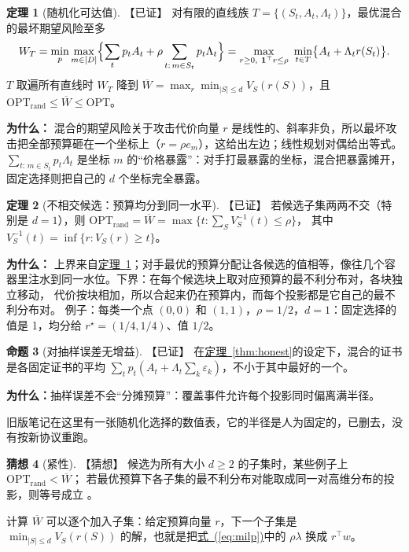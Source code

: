 \documentclass[11pt,a4paper,fontset=none]{ctexart}
\newcommand{\Eqref}[1]{\hyperref[#1]{式~(\ref*{#1})}}
\newcommand{\Nref}[2]{\hyperref[#2]{#1~\ref*{#2}}}
\theoremstyle{definition}
\newtheorem{proposition}{命题}
\newtheorem{theorem}[proposition]{定理}
\newtheorem{conjecture}[proposition]{猜想}
\newenvironment{why}{\par\noindent\textbf{为什么：}\ignorespaces}{\par}
\newcommand{\status}[1]{\textrm{【#1】}}
\begin{document}
\begin{theorem}[随机化可达值]\label{thm:random}\status{已证}
对有限的直线族 $T=\{(S_t,A_t,\Lambda_t)\}$，最优混合的最坏期望风险至多
\begin{equation}\label{eq:wt}
W_T=\min_p\max_{m\in[D]}\Bigl\{\sum_tp_tA_t+\rho\sum_{t:\,m\in S_t}p_t\Lambda_t\Bigr\}
=\max_{r\ge0,\ \mathbf 1^\top r\le\rho}\ \min_{t\in T}\bigl\{A_t+\Lambda_tr(S_t)\bigr\}.
\end{equation}
$T$ 取遍所有直线时 $W_T$ 降到 $\overline W=\max_r\min_{|S|\le d}V_S(r(S))$，且 $\mathrm{OPT}_{\mathrm{rand}}\le\overline W\le\mathrm{OPT}$。
\end{theorem}
\begin{why}
混合的期望风险关于攻击代价向量 $r$ 是线性的、斜率非负，所以最坏攻击把全部预算砸在一个坐标上（$r=\rho e_m$），这给出左边；线性规划对偶给出等式。
$\sum_{t:\,m\in S_t}p_t\Lambda_t$ 是坐标 $m$ 的“价格暴露”：对手打最暴露的坐标，混合把暴露摊开，固定选择则把自己的 $d$ 个坐标完全暴露。
\end{why}

\begin{theorem}[不相交候选：预算均分到同一水平]\label{thm:waterfill}\status{已证}
若候选子集两两不交（特别是 $d=1$），则 $\mathrm{OPT}_{\mathrm{rand}}=\overline W=\max\{t:\sum_SV_S^{-1}(t)\le\rho\}$，
其中 $V_S^{-1}(t)=\inf\{r:V_S(r)\ge t\}$。
\end{theorem}
\begin{why}
上界来自\Nref{定理}{thm:random}；对手最优的预算分配让各候选的值相等，像往几个容器里注水到同一水位。下界：在每个候选块上取对应预算的最不利分布对，各块独立移动，
代价按块相加，所以合起来仍在预算内，而每个投影都是它自己的最不利分布对。
例子：每类一个点 $(0,0)$ 和 $(1,1)$，$\rho=1/2$，$d=1$：固定选择的值是 1，均分给 $r^\star=(1/4,1/4)$、值 $1/2$。
\end{why}

\begin{proposition}[对抽样误差无增益]\label{prop:nature}\status{已证}
在\Nref{定理}{thm:honest}的设定下，混合的证书是各固定证书的平均 $\sum_tp_t(A_t+\Lambda_t\sum_k\varepsilon_k)$，不小于其中最好的一个。
\end{proposition}
\begin{why}抽样误差不会“分摊预算”：覆盖事件允许每个投影同时偏离满半径。\end{why}

旧版笔记在这里有一张随机化选择的数值表，它的半径是人为固定的，已删去，没有按新协议重跑。

\begin{conjecture}[紧性]\label{conj:tight}\status{猜想}
候选为所有大小 $d\ge2$ 的子集时，某些例子上 $\mathrm{OPT}_{\mathrm{rand}}<\overline W$；
若最优预算下各子集的最不利分布对能取成同一对高维分布的投影，则等号成立 \cite{vorobev1962consistent}。
\end{conjecture}
计算 $\overline W$ 可以逐个加入子集：给定预算向量 $r$，下一个子集是 $\min_{|S|\le d}V_S(r(S))$ 的解，也就是把\Eqref{eq:milp}中的 $\rho\lambda$ 换成 $r^\top w$。
\end{document}
